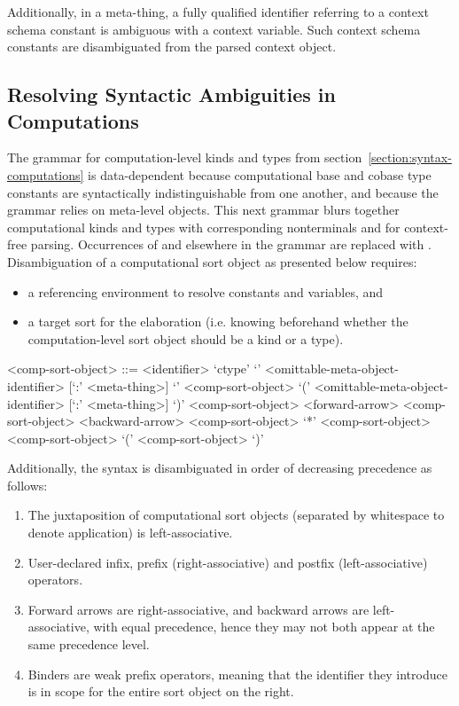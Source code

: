 Additionally, in a meta-thing, a fully qualified identifier referring to a context schema constant is ambiguous with a context variable.
Such context schema constants are disambiguated from the parsed context object.

\subsection{Resolving Syntactic Ambiguities in Computations}

The grammar for computation-level kinds and types from section~\ref{section:syntax-computations} is data-dependent because computational base and cobase type constants are syntactically indistinguishable from one another, and because the grammar relies on meta-level objects.
This next grammar blurs together computational kinds and types with corresponding nonterminals  and  for context-free parsing.
Occurrences of  and  elsewhere in the grammar are replaced with .
Disambiguation of a computational sort object as presented below requires:
\begin{itemize}
\item a referencing environment to resolve constants and variables, and
\item a target sort for the elaboration (i.e. knowing beforehand whether the computation-level sort object should be a kind or a type).
\end{itemize}

\begin{grammar}
<comp-sort-object> ::= <identifier>
\alt `ctype'
\alt `{' <omittable-meta-object-identifier> [`:' <meta-thing>] `}' <comp-sort-object>
\alt `(' <omittable-meta-object-identifier> [`:' <meta-thing>] `)' <comp-sort-object>
 <forward-arrow> <comp-sort-object>
 <backward-arrow> <comp-sort-object>
 `*' <comp-sort-object>
 <comp-sort-object>
\alt `(' <comp-sort-object> `)'
\end{grammar}

Additionally, the syntax is disambiguated in order of decreasing precedence as follows:

\begin{enumerate}
\item The juxtaposition of computational sort objects (separated by whitespace to denote application) is left-associative.
\item User-declared infix, prefix (right-associative) and postfix (left-associative) operators.
\item Forward arrows are right-associative, and backward arrows are left-associative, with equal precedence, hence they may not both appear at the same precedence level.
\item Binders are weak prefix operators, meaning that the identifier they introduce is in scope for the entire sort object on the right.
\end{enumerate}
